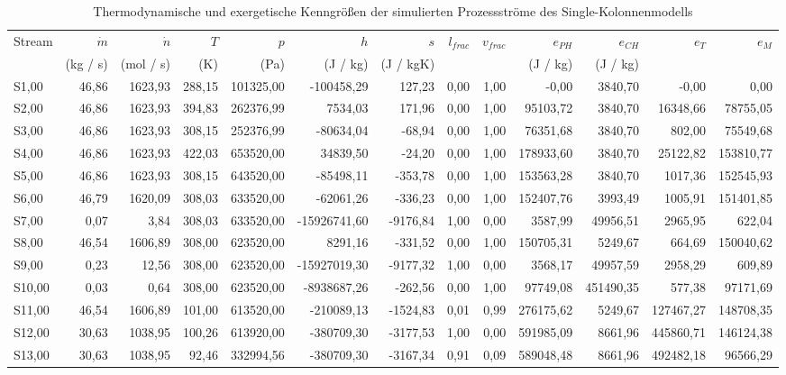 \begin{longtable}{lrrrrrrrrrrrr}
\caption{Thermodynamische und exergetische Kenngrößen der simulierten Prozessströme des Single-Kolonnenmodells} \\
\hline
Stream & $\dot m$ & $\dot n$ & $T$ & $p$ & $h$ & $s$ & $l_{frac}$ & $v_{frac}$ & $e_{PH}$ & $e_{CH}$ & $e_T$ & $e_M$ \\
 & (kg / s) & (mol / s) & (K) & (Pa) & (J / kg) & (J / kgK) &  &  & (J / kg) & (J / kg) &  &  \\
\hline
S1,00 & 46,86 & 1623,93 & 288,15 & 101325,00 & -100458,29 & 127,23 & 0,00 & 1,00 & -0,00 & 3840,70 & -0,00 & 0,00 \\
S2,00 & 46,86 & 1623,93 & 394,83 & 262376,99 & 7534,03 & 171,96 & 0,00 & 1,00 & 95103,72 & 3840,70 & 16348,66 & 78755,05 \\
S3,00 & 46,86 & 1623,93 & 308,15 & 252376,99 & -80634,04 & -68,94 & 0,00 & 1,00 & 76351,68 & 3840,70 & 802,00 & 75549,68 \\
S4,00 & 46,86 & 1623,93 & 422,03 & 653520,00 & 34839,50 & -24,20 & 0,00 & 1,00 & 178933,60 & 3840,70 & 25122,82 & 153810,77 \\
S5,00 & 46,86 & 1623,93 & 308,15 & 643520,00 & -85498,11 & -353,78 & 0,00 & 1,00 & 153563,28 & 3840,70 & 1017,36 & 152545,93 \\
S6,00 & 46,79 & 1620,09 & 308,03 & 633520,00 & -62061,26 & -336,23 & 0,00 & 1,00 & 152407,76 & 3993,49 & 1005,91 & 151401,85 \\
S7,00 & 0,07 & 3,84 & 308,03 & 633520,00 & -15926741,60 & -9176,84 & 1,00 & 0,00 & 3587,99 & 49956,51 & 2965,95 & 622,04 \\
S8,00 & 46,54 & 1606,89 & 308,00 & 623520,00 & 8291,16 & -331,52 & 0,00 & 1,00 & 150705,31 & 5249,67 & 664,69 & 150040,62 \\
S9,00 & 0,23 & 12,56 & 308,00 & 623520,00 & -15927019,30 & -9177,32 & 1,00 & 0,00 & 3568,17 & 49957,59 & 2958,29 & 609,89 \\
S10,00 & 0,03 & 0,64 & 308,00 & 623520,00 & -8938687,26 & -262,56 & 0,00 & 1,00 & 97749,08 & 451490,35 & 577,38 & 97171,69 \\
S11,00 & 46,54 & 1606,89 & 101,00 & 613520,00 & -210089,13 & -1524,83 & 0,01 & 0,99 & 276175,62 & 5249,67 & 127467,27 & 148708,35 \\
S12,00 & 30,63 & 1038,95 & 100,26 & 613920,00 & -380709,30 & -3177,53 & 1,00 & 0,00 & 591985,09 & 8661,96 & 445860,71 & 146124,38 \\
S13,00 & 30,63 & 1038,95 & 92,46 & 332994,56 & -380709,30 & -3167,34 & 0,91 & 0,09 & 589048,48 & 8661,96 & 492482,18 & 96566,29 \\

\end{longtable}
